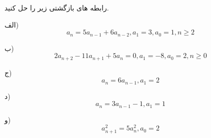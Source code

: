\exercise
رابطه های بازگشتی زیر را حل کنید.

الف)
$$a_n = 5a_{n-1} + 6a_{n-2}, a_1 = 3, a_0 = 1, n \geq 2$$

ب)
$$2a_{n+2} - 11a_{n+1} + 5a_n = 0, a_1 = -8, a_0 = 2, n \geq 0$$

ج)
$$a_n = 6a_{n-1} , a_1 = 2$$

د)
$$a_n = 3a_{n-1} - 1, a_1 = 1$$

و)
$$a_{n+1} ^2 = 5a_n^2, a_0 = 2$$